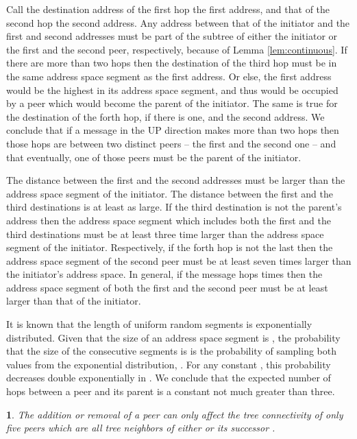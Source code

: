 \documentclass[12pt,english,journal]{elsarticle}
\makeatletter
\numberwithin{equation}{section}
\numberwithin{figure}{section}
\theoremstyle{plain}
\theoremstyle{plain}
\newtheorem{lem}[thm]{\protect\lemmaname}
\newenvironment{proof}[1][\protect\proofname]{\par
\normalfont\topsep6\p@\@plus6\p@\relax
\trivlist
\itemindent\parindent
\item[\hskip\labelsep
\scshape
#1]\ignorespaces
}{\endtrivlist\@endpefalse
}
\providecommand{\proofname}{Proof}
\providecommand{\lemmaname}{Lemma}
\makeatother
\begin{document}
\begin{proof}
Call the destination address of the first hop the first address, and
that of the second hop the second address. Any address between that
of the initiator and the first and second addresses must be part of
the subtree of either the initiator or the first and the second peer,
respectively, because of Lemma \ref{lem:continuous}. If there are
more than two hops then the destination of the third hop must be in
the same address space segment as the first address. Or else, the
first address would be the highest in its address space segment, and
thus would be occupied by a peer which would become the parent of
the initiator. The same is true for the destination of the forth hop,
if there is one, and the second address. We conclude that if a message
in the UP direction makes more than two hops then those hops are between
two distinct peers -- the first and the second one -- and that eventually,
one of those peers must be the parent of the initiator.

The distance between the first and the second addresses must be larger
than the address space segment of the initiator. The distance between
the first and the third destinations is at least as large. If the
third destination is not the parent's address then the address space
segment which includes both the first and the third destinations must
be at least three time larger than the address space segment of the
initiator. Respectively, if the forth hop is not the last then the
address space segment of the second peer must be at least seven times
larger than the initiator's address space. In general, if the message
hops  times then the address space segment of both the first
and the second peer must be at least  larger than that
of the initiator.

It is known \citep{randomsegments} that the length of uniform random
segments is exponentially distributed. Given that the size of an address
space segment is , the probability that the size of the consecutive
segments is  is the probability of sampling both values
from the exponential distribution, .
For any constant , this probability decreases double exponentially
in . We conclude that the expected number of hops between a peer
and its parent is a constant not much greater than three.\end{proof}
\begin{lem}
The addition or removal of a peer  can only affect the tree
connectivity of only five peers which are all tree neighbors of either
 or its successor .\end{lem}
\end{document}
